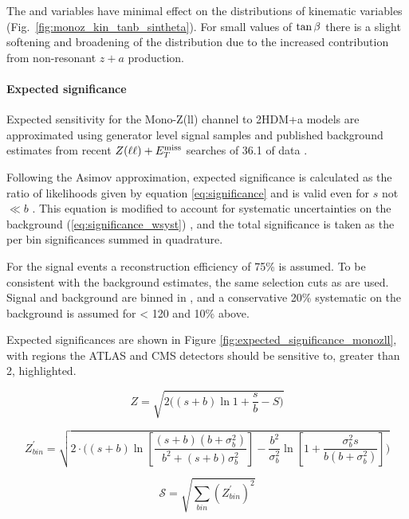 The \tanb and \sinp variables have minimal effect on the distributions of kinematic variables (Fig.~\ref{fig:monoz_kin_tanb_sintheta}).  For small values of $\tan\beta$ there is a slight softening and broadening of the \MET distribution due to the increased contribution from non-resonant $z+a$ production.


\paragraph{Expected significance}

Expected sensitivity for the Mono-Z(ll) channel to 2HDM+a models are approximated using generator level signal samples and published background estimates from recent $Z(\ell \ell) + E_T^\mathrm{miss}$ searches of 36.1 \ifb of data \cite{Aaboud:2017bja}.

Following the Asimov approximation, expected significance is calculated as the ratio of likelihoods given by equation \ref{eq:significance} and is valid even for $s$ not $\ll b$ \cite{Cowan:2010js}.  
This equation is modified to account for systematic uncertainties on the background (\ref{eq:significance_wsyst}) \cite{Cowan:2012}, and the total significance is taken as the per bin significances summed in quadrature.

For the signal events a reconstruction efficiency of 75\% is assumed.  To be consistent with the background estimates, the same selection cuts as \cite{Aaboud:2017bja} are used.  Signal and background are binned in \MET, and a conservative 20\% systematic on the background is assumed for \MET < 120 \GeV and 10\% above.

Expected significances are shown in Figure \ref{fig:expected_significance_monozll}, with regions the ATLAS and CMS detectors should be sensitive to, greater than 2, highlighted.

\begin{equation}
\label{eq:significance}
Z = \sqrt{2 \bigg( (s+b) \ln{1 + \frac{s}{b}} - S \bigg) }
\end{equation}


\begin{equation}
\label{eq:significance_wsyst}
Z^\prime_{bin} = \sqrt{ 2 \cdot \bigg( (s+b) \ln[\frac{ (s+b) (b+\sigma_b^2) } {b^2 + (s+b) \sigma_b^2} ]- \frac{b^2}{\sigma_b^2} \ln[1 + \frac{\sigma_b^2 s}{b(b+\sigma_b^2)} ] \bigg) }
\end{equation}

\begin{equation}
\mathcal{S} = \sqrt{\sum_{bin} (Z^\prime_{bin})^2}
\end{equation}

